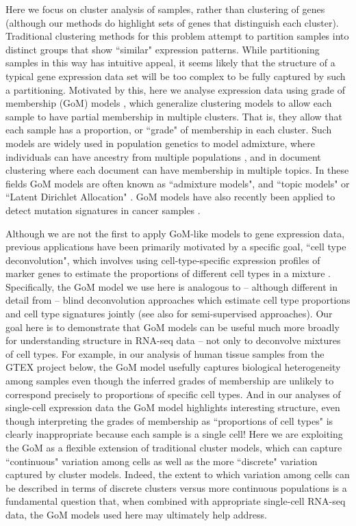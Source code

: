 \documentclass[10pt,letterpaper]{article}
\begin{document}
Here we focus on cluster analysis of samples, rather than clustering of genes (although our methods do highlight sets of genes that distinguish each cluster).
Traditional clustering methods for this problem attempt to partition samples into distinct groups that show ``similar" expression patterns.
While partitioning samples in this way has intuitive appeal,
it seems likely that the structure of a typical gene expression data set will be too complex to be fully captured by such a partitioning.
Motivated by this, here we analyse expression data using grade of membership (GoM) models \cite{Erosheva2006}, which generalize clustering models
to allow each sample to have partial membership in multiple clusters.
That is, they allow that each sample has a proportion, or ``grade" of membership in each cluster. Such
models are widely used in population genetics to model admixture, where individuals can have ancestry from multiple populations \cite{Pritchard2000},
and in document clustering \cite{Blei2003,Blei2009} where each document can have membership in multiple topics. In these fields
GoM models are often known as ``admixture models", and ``topic models" or ``Latent Dirichlet Allocation" \cite{Blei2003}. GoM models have also recently
been applied to detect mutation signatures in cancer samples \cite{Shiraishi2015}.

Although we are not the first to apply GoM-like models to gene expression data, previous applications
have been primarily motivated by a specific goal, ``cell type deconvolution", which involves
using cell-type-specific expression profiles of marker genes to estimate the proportions of different cell types in a mixture \cite{Lindsay2013, Ahn2013, Quon2013}.
Specifically, the GoM model we use here is analogous to -- although different in detail from --
blind deconvolution approaches \cite{Schwartz2010,Repsilber2010,Wang2015}
 which estimate cell type proportions and cell type signatures jointly (see also \cite{Shen-Orr2010,Qiao2012} for semi-supervised approaches).
Our goal here is to demonstrate that GoM models can be useful much more broadly
for understanding structure in RNA-seq data -- not only to deconvolve
mixtures of cell types. For example, in our analysis of human tissue samples from the GTEX project below, the GoM model
usefully captures biological heterogeneity among samples even though the inferred grades of
membership are unlikely to correspond precisely to proportions of specific cell types.
And in our analyses of single-cell expression data the GoM model highlights interesting
structure, even though interpreting the grades of membership as ``proportions of cell types" is clearly inappropriate because each sample is a single cell!
Here we are exploiting the GoM as a flexible extension of traditional cluster models,
which can capture ``continuous" variation among cells as well as the more ``discrete" variation captured by cluster models.
Indeed, the extent to which variation among cells can be described in terms of discrete clusters versus more continuous populations
is a fundamental question that, when combined with appropriate single-cell RNA-seq data, the GoM models used here may
ultimately help address.
\end{document}
